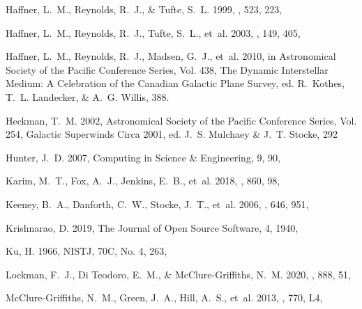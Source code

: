 \documentclass[twocolumn]{aastex63}
\begin{document}
\begin{thebibliography}{}
{
{Haffner}, L.~M., {Reynolds}, R.~J., \& {Tufte}, S.~L. 1999, \apj, 523, 223,

{Haffner}, L.~M., {Reynolds}, R.~J., {Tufte}, S.~L., {et~al.} 2003, \apjs, 149,
  405, 

{Haffner}, L.~M., {Reynolds}, R.~J., {Madsen}, G.~J., {et~al.} 2010, in
  Astronomical Society of the Pacific Conference Series, Vol. 438, The Dynamic
  Interstellar Medium: A Celebration of the Canadian Galactic Plane Survey, ed.
  R.~{Kothes}, T.~L. {Landecker}, \& A.~G. {Willis}, 388.
\newblock {}

{Heckman}, T.~M. 2002, Astronomical Society of the Pacific Conference Series,
  Vol. 254, {Galactic Superwinds Circa 2001}, ed. J.~S. {Mulchaey} \& J.~T.
  {Stocke}, 292

Hunter, J.~D. 2007, Computing in Science {\&} Engineering, 9, 90,

{Karim}, M.~T., {Fox}, A.~J., {Jenkins}, E.~B., {et~al.} 2018, \apj, 860, 98,

{Keeney}, B.~A., {Danforth}, C.~W., {Stocke}, J.~T., {et~al.} 2006, \apj, 646,
  951, 

{Krishnarao}, D. 2019, The Journal of Open Source Software, 4, 1940,

{Ku}, H. 1966, NISTJ, 70C, No. 4, 263, 

{Lockman}, F.~J., {Di Teodoro}, E.~M., \& {McClure-Griffiths}, N.~M. 2020,
  \apj, 888, 51, 

{McClure-Griffiths}, N.~M., {Green}, J.~A., {Hill}, A.~S., {et~al.} 2013,
  \apjl, 770, L4, 

}
\end{thebibliography}
\end{document}
